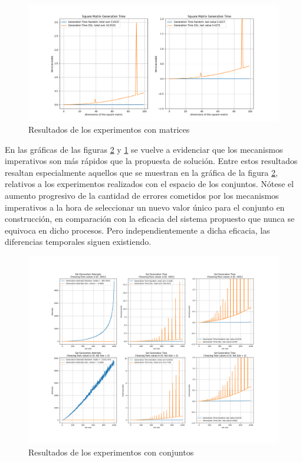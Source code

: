 \begin{figure}[!ht]
      \includegraphics[width=\linewidth]{Graphics/exp4.png}
      \caption{Resultados de los experimentos con matrices}
      \label{fig:exp4}
\end{figure}



En las gráficas de las figuras \ref{fig:exp3} y \ref{fig:exp4} se vuelve a evidenciar que los mecanismos imperativos 
son más rápidos que la propuesta de solución. Entre estos resultados resaltan especialmente aquellos 
que se muestran en la gráfica de la figura \ref{fig:exp3}, relativos a los experimentos realizados con el espacio 
de los conjuntos. Nótese el aumento progresivo de la cantidad de errores cometidos por los mecanismos 
imperativos a la hora de seleccionar un nuevo valor único para el conjunto en construcción, en comparación con la 
eficacia del sistema propuesto que nunca se equivoca en dicho procesos. Pero independientemente a 
dicha eficacia, las diferencias temporales siguen existiendo.

\begin{figure}[H]
      \includegraphics[width=\linewidth]{Graphics/exp3.png}
      \caption{Resultados de los experimentos con conjuntos}
      \label{fig:exp3}
\end{figure}




